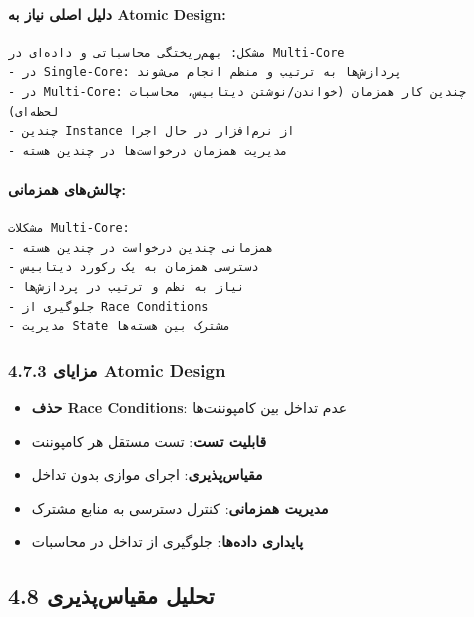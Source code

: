 \documentclass[
]{article}
\providecommand{\tightlist}{%
  \setlength{\itemsep}{0pt}\setlength{\parskip}{0pt}}
\begin{document}
\paragraph{دلیل اصلی نیاز به Atomic
Design:}\label{ux62fux644ux6ccux644-ux627ux635ux644ux6cc-ux646ux6ccux627ux632-ux628ux647-atomic-design}

\begin{verbatim}
مشکل: بهم‌ریختگی محاسباتی و داده‌ای در Multi-Core
- در Single-Core: پردازش‌ها به ترتیب و منظم انجام می‌شوند
- در Multi-Core: چندین کار همزمان (خواندن/نوشتن دیتابیس، محاسبات لحظه‌ای)
- چندین Instance از نرم‌افزار در حال اجرا
- مدیریت همزمان درخواست‌ها در چندین هسته
\end{verbatim}

\paragraph{چالش‌های
همزمانی:}\label{ux686ux627ux644ux634ux647ux627ux6cc-ux647ux645ux632ux645ux627ux646ux6cc}

\begin{verbatim}
مشکلات Multi-Core:
- همزمانی چندین درخواست در چندین هسته
- دسترسی همزمان به یک رکورد دیتابیس
- نیاز به نظم و ترتیب در پردازش‌ها
- جلوگیری از Race Conditions
- مدیریت State مشترک بین هسته‌ها
\end{verbatim}

\subsubsection{4.7.3 مزایای Atomic
Design}\label{ux645ux632ux627ux6ccux627ux6cc-atomic-design}

\begin{itemize}
\tightlist
\item
  \textbf{حذف Race Conditions}: عدم تداخل بین کامپوننت‌ها
\item
  \textbf{قابلیت تست}: تست مستقل هر کامپوننت
\item
  \textbf{مقیاس‌پذیری}: اجرای موازی بدون تداخل
\item
  \textbf{مدیریت همزمانی}: کنترل دسترسی به منابع مشترک
\item
  \textbf{پایداری داده‌ها}: جلوگیری از تداخل در محاسبات
\end{itemize}

\subsection{4.8 تحلیل
مقیاس‌پذیری}\label{ux62aux62dux644ux6ccux644-ux645ux642ux6ccux627ux633ux67eux630ux6ccux631ux6cc-1}
\end{document}
